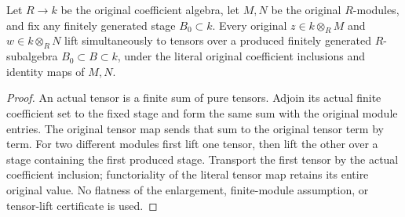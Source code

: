 \begin{lemma}
\label{lem:kn-arithmetic-original-line-coefficients}
\leanok
Let $R\to k$ be the original coefficient algebra, let $M,N$ be the original
$R$-modules, and fix any finitely generated stage $B_0\subset k$.
Every original $z\in k\otimes_R M$ and $w\in k\otimes_R N$ lift
simultaneously to tensors over a produced finitely generated
$R$-subalgebra $B_0\subset B\subset k$, under the literal original
coefficient inclusions and identity maps of $M,N$.
\end{lemma}
\begin{proof}
An actual tensor is a finite sum of pure tensors.  Adjoin its actual finite
coefficient set to the fixed stage and form the same sum with the original
module entries.  The original tensor map sends that sum to the original
tensor term by term.  For two different modules first lift one tensor,
then lift the other over a stage containing the first produced stage.
Transport the first tensor by the actual coefficient inclusion; functoriality
of the literal tensor map retains its entire original value.  No flatness
of the enlargement, finite-module assumption, or tensor-lift certificate is
used.
\end{proof}
